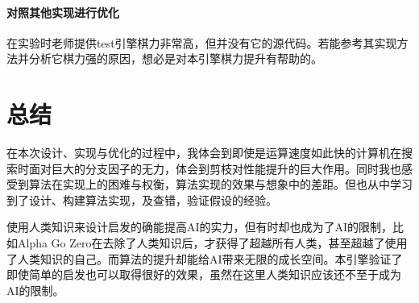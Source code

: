 \documentclass{ctexart}
\begin{document}
\paragraph{对照其他实现进行优化} 在实验时老师提供test引擎棋力非常高，但并没有它的源代码。若能参考其实现方法并分析它棋力强的原因，想必是对本引擎棋力提升有帮助的。

\section{总结}

在本次设计、实现与优化的过程中，我体会到即使是运算速度如此快的计算机在搜索时面对巨大的分支因子的无力，体会到剪枝对性能提升的巨大作用。同时我也感受到算法在实现上的困难与权衡，算法实现的效果与想象中的差距。但也从中学习到了设计、构建算法实现，及查错，验证假设的经验。

使用人类知识来设计启发的确能提高AI的实力，但有时却也成为了AI的限制，比如Alpha Go Zero在去除了人类知识后，才获得了超越所有人类，甚至超越了使用了人类知识的自己。而算法的提升却能给AI带来无限的成长空间。本引擎验证了即使简单的启发也可以取得很好的效果，虽然在这里人类知识应该还不至于成为AI的限制。

 

\end{document}
